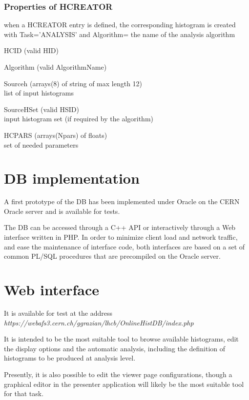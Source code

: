 \documentclass{lhcbnote}
\begin{document}
\subsubsection{Properties of HCREATOR}
when a HCREATOR entry is defined, the corresponding histogram is
created with Task='ANALYSIS' and Algorithm= the name of the analysis algorithm
\begin{description}
\item{HCID} (valid HID)
\item{Algorithm} (valid AlgorithmName)
\item{Sourceh} (arrays(8) of string of max length 12)\\
list of input histograms
\item{SourceHSet} (valid HSID)\\
input histogram set (if required by the algorithm)
\item{HCPARS} (arrays(Npars) of floats)\\
set of needed parameters 
\end{description}

\section{DB implementation}
A first prototype of the DB has been implemented under Oracle on the
CERN Oracle server and is available for tests.

The DB can be accessed through a C++ API or interactively through a
Web interface written in PHP. In order to minimize client load and
network traffic, and ease the maintenance of interface code, both
interfaces  are based on a set of common PL/SQL procedures that are
precompiled on the Oracle server.

\section{Web interface}

It is available for test at the address\\
{\it https://webafs3.cern.ch/ggrazian/lhcb/OnlineHistDB/index.php}

It is intended to be the most suitable tool to browse available
histograms, edit the display options and the automatic analysis, including
the definition of histograms to be produced at analysis level.

Presently, it is also possible to edit the viewer page configurations, though
a graphical editor in the presenter application will likely be the
most suitable tool for that task.
\end{document}
